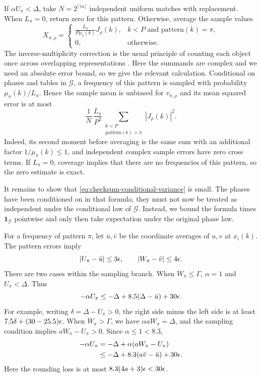 If $\alpha U_\pi<\Delta$, take
$N=2^{\lceil\tau n\rceil}$ independent uniform matches with replacement.
When $L_\pi=0$, return zero for this pattern.  Otherwise, average the
sample values
\begin{equation}
 X_{\pi,\rho}=
 \begin{cases}
 \displaystyle\frac{L_\pi}{P\mu_\pi(k)}J_\rho(k),
      &k<P\text{ and }\text{pattern}(k)=\pi,\\[2mm]
 0,&\text{otherwise}.
 \end{cases}
 \label{eq:checksum-sample-weight}
\end{equation}
The inverse-multiplicity correction is the usual principle of counting
each object once across overlapping representations
\cite[Section~5]{KLM1989}.  Here the summands are complex and
we need an absolute error bound, so we give the relevant calculation.
Conditional on phases and tables in $\mathcal G$, a frequency of this
pattern is sampled with probability $\mu_\pi(k)/L_\pi$.  Hence the
sample mean is unbiased for $v_{\pi,\rho}$ and its mean squared error
is at most
\begin{equation}
 \frac1N\,\frac{L_\pi}{P^2}
 \sum_{\substack{k<P\\\text{pattern}(k)=\pi}}|J_\rho(k)|^2.
 \label{eq:checksum-conditional-variance}
\end{equation}
Indeed, its second moment before averaging is the same sum with an
additional factor $1/\mu_\pi(k)\le1$, and independent complex sample
errors have zero cross terms.  If $L_\pi=0$, coverage implies that
there are no frequencies of this pattern, so the zero estimate is exact.

It remains to show that \eqref{eq:checksum-conditional-variance} is
small.  The phases have been conditioned on in that formula; they must
not now be treated as independent under the conditional law of
$\mathcal G$.  Instead, we bound the formula times
$\mathbf1_{\mathcal G}$ pointwise and only then take expectation under
the original phase law.

For a frequency of pattern $\pi$, let $\bar u,\bar v$ be the coordinate
averages of $u,v$ at $x_i(k)$.  The pattern errors imply
\begin{equation}
 |U_\pi-\bar u|\le3\epsilon,
 \qquad |W_\pi-\bar v|\le4\epsilon.
 \label{eq:checksum-profile-errors}
\end{equation}
There are two cases within the sampling branch.  When
$W_\pi\le\Gamma$, $\alpha=1$ and $U_\pi<\Delta$.  Thus
\begin{equation}
 -\alpha U_\pi
 \le-\Delta+8.5(\Delta-\bar u)+30\epsilon.
 \label{eq:checksum-domination-one}
\end{equation}
For example, writing $\delta=\Delta-U_\pi>0$, the right side minus
the left side is at least $7.5\delta+(30-25.5)\epsilon$.
When $W_\pi>\Gamma$, we have $\alpha aW_\pi=\Delta$, and the sampling
condition implies $aW_\pi-U_\pi>0$.  Since $\alpha\le1<8.3$,
\begin{align}
 -\alpha U_\pi
 &=-\Delta+\alpha(aW_\pi-U_\pi)\notag\\
 &\le-\Delta+8.3(a\bar v-\bar u)+30\epsilon.
 \label{eq:checksum-domination-two}
\end{align}
Here the rounding loss is at most $8.3(4a+3)\epsilon<30\epsilon$.

